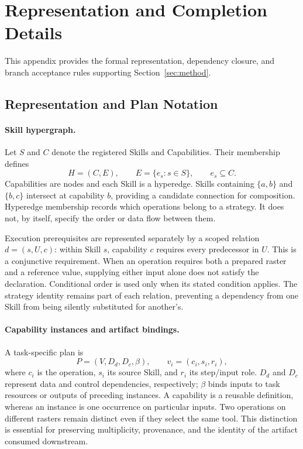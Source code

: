 \section{Representation and Completion Details}
\label{app:method-details}
This appendix provides the formal representation, dependency closure, and branch acceptance rules supporting Section~\ref{sec:method}.

\subsection{Representation and Plan Notation}
\paragraph{Skill hypergraph.}
Let $S$ and $C$ denote the registered Skills and Capabilities. Their membership defines
\begin{equation}
H=(C,E),\qquad E=\{e_s:s\in S\},\qquad e_s\subseteq C.
\label{eq:hypergraph}
\end{equation}
Capabilities are nodes and each Skill is a hyperedge. Skills containing $\{a,b\}$ and $\{b,c\}$ intersect at capability $b$, providing a candidate connection for composition. Hyperedge membership records which operations belong to a strategy. It does not, by itself, specify the order or data flow between them.

Execution prerequisites are represented separately by a scoped relation $d=(s,U,c)$: within Skill $s$, capability $c$ requires every predecessor in $U$. This is a conjunctive requirement. When an operation requires both a prepared raster and a reference value, supplying either input alone does not satisfy the declaration. Conditional order is used only when its stated condition applies. The strategy identity remains part of each relation, preventing a dependency from one Skill from being silently substituted for another's.

\paragraph{Capability instances and artifact bindings.}
A task-specific plan is
\begin{equation}
P=(V,D_d,D_c,\beta),\qquad v_i=(c_i,s_i,r_i),
\label{eq:plan}
\end{equation}
where $c_i$ is the operation, $s_i$ its source Skill, and $r_i$ its step/input role. $D_d$ and $D_c$ represent data and control dependencies, respectively; $\beta$ binds inputs to task resources or outputs of preceding instances. A capability is a reusable definition, whereas an instance is one occurrence on particular inputs. Two operations on different rasters remain distinct even if they select the same tool. This distinction is essential for preserving multiplicity, provenance, and the identity of the artifact consumed downstream.

